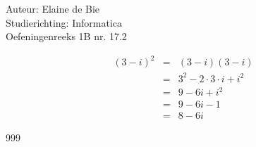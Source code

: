 \documentclass[a4paper]{article}
\begin{document}
  
\noindent \large Auteur: Elaine de Bie \\
\noindent \large Studierichting: Informatica\\
\noindent \large Oefeningenreeks 1B nr. 17.2\\

\medskip

\normalsize


\begin{eqnarray*}
(3 - i)^2 & = & (3 - i)(3 - i) \\
& = & 3^2 - 2 \cdot 3 \cdot i + i^2 \\
& = & 9 - 6i + i^2 \\
& = & 9 - 6i - 1 \\
& = & 8 - 6i
\end{eqnarray*}




\begin{thebibliography}{999}
\end{thebibliography}
\end{document}
